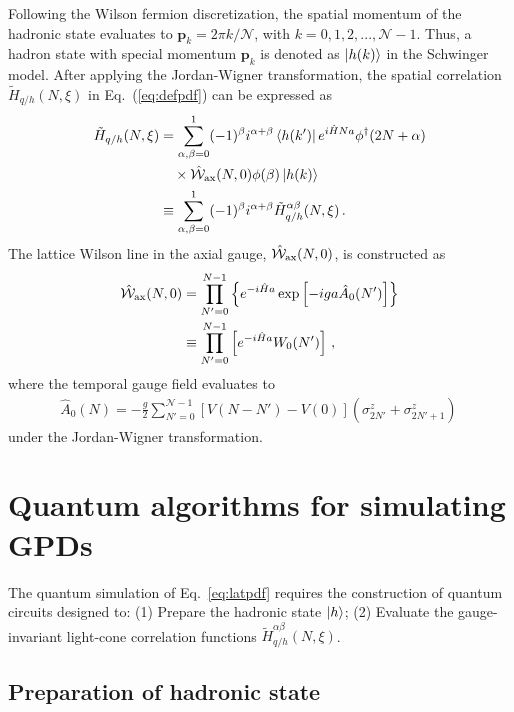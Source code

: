 \documentclass[aps,prd,twocolumn,superscriptaddress,notitlepage,nofootinbib,preprintnumbers]{revtex4-1}
\begin{document}
Following the Wilson fermion discretization, the spatial momentum of the hadronic state evaluates to $\mathbf{p}_k = 2\pi k/\mathcal{N}$, with $k = 0,1,2,...,\mathcal{N}-1$. Thus, a hadron state with special momentum $\mathbf{p}_k$ is denoted as $\ket{h(k)}$ in the Schwinger model. After applying the Jordan-Wigner transformation, the spatial correlation $\tilde{H}_{q/h}(N,\xi)$ in Eq.~(\ref{eq:defpdf}) can be expressed as
\begin{align}\label{eq:latpdf}
    \tilde{H}_{q/h}(N,\xi) &= \sum_{\alpha,\beta=0}^1 (-1)^{\beta} i^{\alpha+\beta} \bra{h(k')} e^{i\hat{H} Na} \phi^\dagger(2N+\alpha) \nonumber\\
    &\quad \times \hat{\mathcal{W}}_{\rm ax}(N,0) \phi(\beta)  \ket{h(k)}\nonumber \\
    &\equiv \sum_{\alpha,\beta=0}^{1} (-1)^\beta i^{\alpha+\beta} \tilde{H}^{\alpha\beta}_{q/h}(N,\xi)\,.
\end{align}
The lattice Wilson line in the axial gauge, $\hat{\mathcal{W}}_{\rm ax}(N,0)$, is constructed as 
\begin{align}\label{eq:wlax}
    \hat{\mathcal{W}}_{\rm ax}(N,0) &= \prod_{N'=0}^{N-1}\left\{e^{-i\hat{H}a} \exp\left[-iga \hat{A}_0(N')\right]\right\}\nonumber\\
    &\equiv \prod_{N'=0}^{N-1} \left[e^{-i \hat{H}a} W_0(N')\right]\,,
\end{align}
where the temporal gauge field evaluates to 
\begin{align}\label{eq:qbA0}
    \hat{A}_0(N) = -\frac{g}{2}\sum_{N'=0}^{\mathcal{N}-1}[V(N-N')-V(0)] \left(\sigma^z_{2N'}+\sigma^z_{2N'+1}\right)\,
\end{align}
under the Jordan-Wigner transformation.


\section{Quantum algorithms for simulating GPDs}
\label{sec-alg}
The quantum simulation of Eq.~\eqref{eq:latpdf} requires the construction of quantum circuits designed to: (1) Prepare the hadronic state $\ket{h}$; (2) Evaluate the gauge-invariant light-cone correlation functions $\tilde{H}^{\alpha \beta}_{q/h}(N,\xi)$.

\subsection{Preparation of hadronic state}
\end{document}
